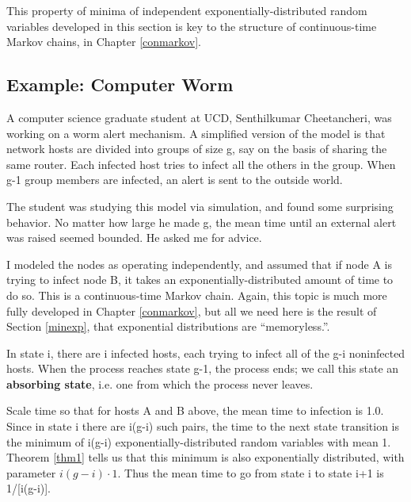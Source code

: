 
This property of minima of independent exponentially-distributed random
variables developed in this section is key to the structure of
continuous-time Markov chains, in Chapter \ref{conmarkov}.

\subsection{Example:  Computer Worm}
\label{senthi}

A computer science graduate student at UCD, Senthilkumar Cheetancheri,
was working on a worm alert mechanism.  A simplified version of the
model is that network hosts are divided into groups of size g, say on
the basis of sharing the same router.  Each infected host tries to
infect all the others in the group.  When g-1 group members are
infected, an alert is sent to the outside world.

The student was studying this model via simulation, and found some
surprising behavior.  No matter how large he made g, the mean time until
an external alert was raised seemed bounded.  He asked me for advice.

I modeled the nodes as operating independently, and assumed that if node
A is trying to infect node B, it takes an exponentially-distributed
amount of time to do so.  This is a continuous-time Markov chain.
Again, this topic is much more fully developed in Chapter
\ref{conmarkov}, but all we need here is the result of Section
\ref{minexp}, that exponential distributions are ``memoryless.''. 

In state i, there are i infected hosts, each trying to infect all of the
g-i noninfected hosts.  When the process reaches state g-1, the process
ends; we call this state an {\bf absorbing state}, i.e. one from which
the process never leaves.

Scale time so that for hosts A and B above, the mean time to infection
is 1.0.  Since in state i there are i(g-i) such pairs, the time to the
next state transition is the minimum of i(g-i) exponentially-distributed
random variables with mean 1.  Theorem \ref{thm1} tells us that this
minimum is also exponentially distributed, with parameter $i(g-i) \cdot
1$.  Thus the mean time to go from state i to state i+1 is 1/[i(g-i)].

